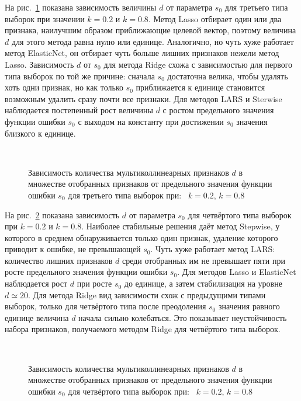 \documentclass[a4paper,12pt]{article}
\begin{document}
На рис.~\ref{fig:d_s0_coltarget} показана зависимость величины $d$ от параметра $s_0$ для третьего типа выборок при значении $k = 0.2$ и $k = 0.8$. Метод Lasso отбирает один или два признака, наилучшим образом приближающие целевой вектор, поэтому величина $d$ для этого метода равна нулю или единице. Аналогично, но чуть хуже работает метод ElasticNet, он отбирает чуть больше лишних признаков нежели метод Lasso. Зависимость $d$ от $s_0$ для метода Ridge схожа с зависимостью для первого типа выборок по той же причине: сначала $s_0$ достаточна велика, чтобы удалять хоть одни признак, но как только $s_0$ приближается к единице становится возможным удалить сразу почти все признаки. Для методов LARS и Sterwise наблюдается постепенный рост величины $d$ с ростом предельного значения функции ошибки $s_0$ с выходом на константу при достижении $s_0$ значения близкого к единице.   

\begin{figure}[!h]
\centering
{}
~
\caption{Зависимость количества мультиколлинеарных признаков $d$ в множестве отобранных признаков от предельного значения функции ошибки $s_0$ для третьего типа выборок при:~ $k = 0.2$,  $k = 0.8$}
\label{fig:d_s0_coltarget}
\end{figure}

На рис.~\ref{fig:d_s0_sumort} показана зависимость $d$ от параметра $s_0$ для четвёртого типа выборок при $k = 0.2$ и $k = 0.8$. Наиболее стабильные решения даёт метод Stepwise, у которого в среднем обнаруживается только один признак, удаление которого приводит к ошибке, не превышающей $s_0$. Чуть хуже работает метод LARS: количество лишних признаков $d$ среди отобранных им не превышает пяти при росте предельного значения функции ошибки $s_0$. Для методов Lasso и ElasticNet наблюдается рост $d$ при росте $s_0$ до единице, а затем стабилизация на уровне $d \simeq 20$. Для метода Ridge вид зависимости схож с предыдущими типами выборок, только для четвёртого типа после преодоления $s_0$ значения равного единице величина $d$ начала сильно колебаться. Это показывает неустойчивость набора признаков, получаемого методом Ridge для четвёртого типа выборок. 

\begin{figure}[!h]
\centering
{}
~
\caption{Зависимость количества мультиколлинеарных признаков $d$ в множестве отобранных признаков от предельного значения функции ошибки $s_0$ для четвёртого типа выборок при:~ $k = 0.2$,  $k = 0.8$}
\label{fig:d_s0_sumort}
\end{figure}
\end{document}
